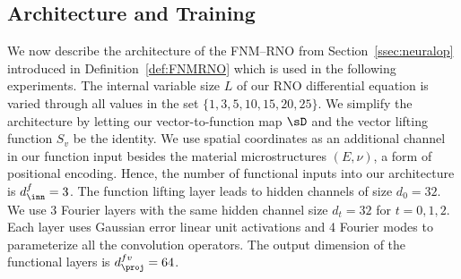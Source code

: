 \documentclass[letterpaper,11pt]{article}
\begin{document}
\subsection{Architecture and Training}\label{subsec:architecture}
We now describe the architecture of the FNM--RNO from Section~\ref{ssec:neuralop} introduced in Definition~\ref{def:FNMRNO} which is used in the following experiments. The internal variable size $L$ of our RNO differential equation is varied through all values in the set $\{1, 3, 5, 10, 15, 20, 25\}$. We simplify the architecture by letting our vector-to-function map $\sD$ and the vector lifting function $S_v$ be the identity. We use spatial coordinates as an additional channel in our function input besides the material microstructures $(E, \nu)$, a form of positional encoding. Hence, the number of functional inputs into our architecture is $d_{\inn}^f = 3$. The function lifting layer leads to hidden channels of size $d_0=32$. We use 3 Fourier layers with the same hidden channel size $d_t=32$ for $t=0,1,2.$ Each layer uses Gaussian error linear unit activations and 4 Fourier modes to parameterize all the convolution operators. The output dimension of the functional layers is $d_{\proj}^{fv} = 64$. 
\end{document}
